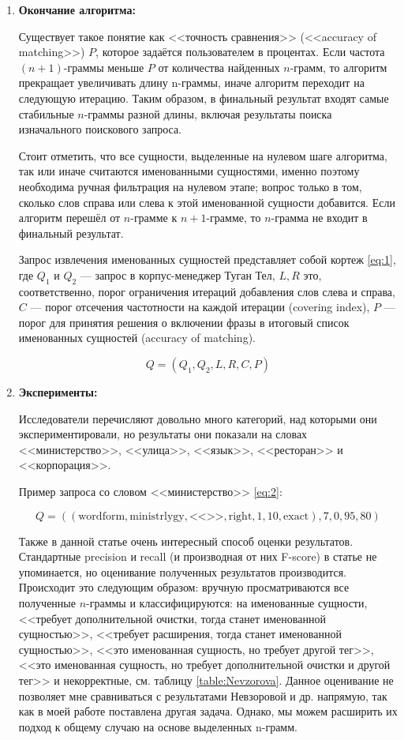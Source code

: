 \begin{enumerate}
\item\textbf{Окончание алгоритма:}

Существует такое понятие как <<точность сравнения>> (<<accuracy of matching>>) $P$, которое задаётся пользователем в процентах. Если частота $(n+1)$-граммы меньше $P$ от количества найденных $n$-грамм, то алгоритм прекращает увеличивать длину n-граммы, иначе алгоритм переходит на следующую итерацию. Таким образом, в финальный результат входят самые стабильные $n$-граммы разной длины, включая результаты поиска изначального поискового запроса.

Стоит отметить, что все сущности, выделенные на нулевом шаге алгоритма, так или иначе считаются именованными сущностями, именно поэтому необходима ручная фильтрация на нулевом этапе; вопрос только в том, сколько слов справа или слева к этой именованной сущности добавится. Если алгоритм перешёл от $n$-грамме к $n+1$-грамме, то $n$-грамма не входит в финальный результат.

Запрос извлечения именованных сущностей представляет собой кортеж \eqref{eq:1}, где $Q_1$ и $Q_2$ --- запрос в корпус-менеджер Туган Тел\cite{tugan_tel}, $L, R$ это, соответственно, порог ограничения итераций добавления слов слева и справа, $C$ --- порог отсечения частотности на каждой итерации (covering index), $P$ --- порог для принятия решения о включении фразы в итоговый список именованных сущностей (accuracy of matching).

\begin{equation}
Q = (Q_1, Q_2, L, R, C, P) \label{eq:1}
\end{equation}

\item\textbf{Эксперименты:}

Исследователи перечисляют довольно много категорий, над которыми они экспериментировали, но результаты они показали на словах <<министерство>>, <<улица>>, <<язык>>, <<ресторан>> и <<корпорация>>.

Пример запроса со словом <<министерство>> \eqref{eq:2}:

\begin{equation}
Q = ((\text{wordform}, \text{ministrlygy}, \text{<<>>}, \text{right}, 1, 10, \text{exact}), 7, 0, 95, 80)  \label{eq:2}
\end{equation}

Также в данной статье очень интересный способ оценки результатов. Стандартные precision и recall (и производная от них F-score) в статье не упоминается, но оценивание полученных результатов производится. Происходит это следующим образом: вручную просматриваются все полученные $n$-граммы и классифицируются: на именованные сущности, <<требует дополнительной очистки, тогда станет именованной сущностью>>, <<требует расширения, тогда станет именованной сущностью>>, <<это именованная сущность, но требует другой тег>>,  <<это именованная сущность, но требует дополнительной очистки и другой тег>> и некорректные, см. таблицу \ref{table:Nevzorova}. Данное оценивание не позволяет мне сравниваться с результатами Невзоровой и др. напрямую, так как в моей работе поставлена другая задача. Однако, мы можем расширить их подход к общему случаю на основе выделенных n-грамм.


\end{enumerate}
